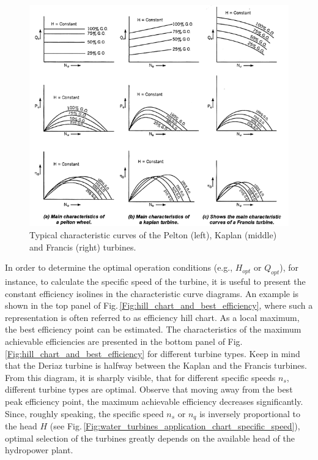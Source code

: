 \begin{figure}[ht!]
	\centering
		\includegraphics[width=14cm]{HydroAndWindPower/Figures/Characteristic_Curves_All_Types.png}
	\caption{Typical characteristic curves of the Pelton (left), Kaplan (middle) and Francis (right) turbines.}
	\label{Fig:typical_characteristic_curves_of_water_turbines}
\end{figure}

In order to determine the optimal operation conditions (e.g., $H_{opt}$ or $Q_{opt}$), for instance, to calculate the specific speed of the turbine, it is useful to present the constant efficiency isolines in the characteristic curve diagrams. An example is shown in the top panel of Fig.\,\ref{Fig:hill_chart_and_best_efficiency}, where such a representation is often referred to as efficiency hill chart. As a local maximum, the best efficiency point can be estimated. The characteristics of the maximum achievable efficiencies are presented in the bottom panel of Fig.\,\ref{Fig:hill_chart_and_best_efficiency} for different turbine types. Keep in mind that the Deriaz turbine is halfway between the Kaplan and the Francis turbines. From this diagram, it is sharply visible, that for different specific speeds $n_s$, different turbine types are optimal. Observe that moving away from the best peak efficiency point, the maximum achievable efficiency decreases significantly. Since, roughly speaking, the specific speed $n_s$ or $n_q$ is inversely proportional to the head $H$ (see Fig.\,\ref{Fig:water_turbines_application_chart_specific_speed}), optimal selection of the turbines greatly depends on the available head of the hydropower plant.

